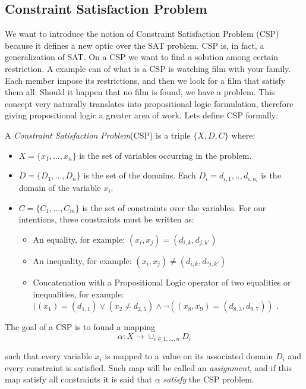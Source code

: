 \subsection{Constraint Satisfaction Problem}

We want to introduce the notion of Constraint Satisfaction Problem (CSP) because it defines a new optic over the SAT problem. CSP is, in fact, a generalization of SAT. On a CSP we want to find a solution among certain restriction. A example can of what is a CSP is watching film with your family. Each member impose its restrictions, and then we look for a film that satisfy them all. Should it happen that no film is found, we have a problem. This concept very naturally translates into propositional logic formulation, therefore giving propositional logic a greater area of work. Lets define CSP formally:

\begin{definition}
  A \emph{Constraint Satisfaction Problem}(CSP) is a triple $\{X,D,C\}$ where:
  \begin{itemize}
  \item $X=\{x_1,...,x_n\}$ is the set of variables  occurring in the problem.
  \item $D=\{D_1,...,D_n\}$ is the set of the domains. Each $D_i={d_{i,1},..,d_{i,n_i}}$ is the domain of the variable $x_i$.
  \item $C=\{C_1,...,C_m\}$ is the set of constraints over the variables. For our intentions, these constraints must be written as:
    \begin{itemize}
    \item An equality, for example: $(x_i, x_j) = (d_{i,k}, d_{j,k'})$
    \item An inequality, for example: $(x_i, x_j) \ne (d_{i,k}, d_{ºj,k'})$
    \item Concatenation with a Propositional Logic operator of two equalities or inequalities, for example: $((x_1) = (d_{1,1}) \vee (x_2 \ne d_{2,5}) \wedge \neg((x_8,x_9) = (d_{8,3},d_{9,7}))$ .
    \end{itemize}
  \end{itemize}
\end{definition}
  The goal of a CSP is to found a mapping \[ \alpha:X\to \cup_{i\in 1,...,n} D_i\]
  
  such that every variable $x_i$ is mapped to a value on its associated domain $D_i$ and every constraint is satisfied. Such map will be called an \emph{assignment}, and if this map satisfy all constraints it is said that $\alpha$ \emph{satisfy} the CSP problem.\\



